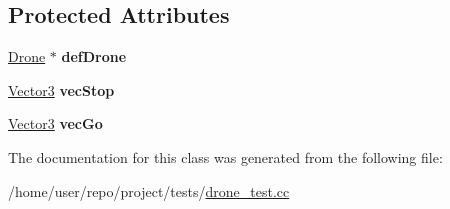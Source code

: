\subsection*{Protected Attributes}
\begin{DoxyCompactItemize}
\item 
\mbox{\label{classDroneTest_a68e3b7078f19567c4ebeadbedc80ba26}} 
\hyperlink{classDrone}{Drone} $\ast$ {\bfseries def\+Drone}
\item 
\mbox{\label{classDroneTest_aa387d4d95e748d3225da376c252b48e9}} 
\hyperlink{classVector3}{Vector3} {\bfseries vec\+Stop}
\item 
\mbox{\label{classDroneTest_a2e6a8cad9cdf074d16e609534a0a50ad}} 
\hyperlink{classVector3}{Vector3} {\bfseries vec\+Go}
\end{DoxyCompactItemize}


The documentation for this class was generated from the following file\+:\begin{DoxyCompactItemize}
\item 
/home/user/repo/project/tests/\hyperlink{drone__test_8cc}{drone\+\_\+test.\+cc}\end{DoxyCompactItemize}
